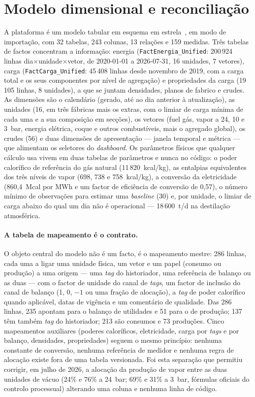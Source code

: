 \section{Modelo dimensional e reconciliação}
\label{sec:modelo-dimensional}

A plataforma é um modelo tabular em esquema em estrela~\cite{KimballRoss2013}, em modo de
importação, com 32 tabelas, 243 colunas, 13 relações e 159 medidas.
Três tabelas de factos concentram a informação: energia
(\texttt{FactEnergia\_Unified}: 200\,924 linhas dia$\times$unidade$\times$vetor,
de 2020-01-01 a 2026-07-31, 16 unidades, 7 vetores), carga
(\texttt{FactCarga\_Unified}: 45\,408 linhas desde novembro de 2019, com a
carga total e os seus componentes por nível de agregação) e propriedades
da carga (19\,105 linhas, 8 unidades), a que se juntam densidades, planos
de fabrico e crudes. As dimensões são o calendário (gerado, até ao dia
anterior à atualização), as unidades (16, em três fábricas mais os
extras, com o limiar de carga mínima de cada uma e a sua composição em
secções), os vetores (fuel gás, vapor a 24, 10 e 3~bar, energia
elétrica, coque e outros combustíveis, mais o agregado global), os crudes
(56) e duas dimensões de apresentação --- janela temporal e métrica ---
que alimentam os seletores do \emph{dashboard}. Os parâmetros físicos que
qualquer cálculo usa vivem em duas tabelas de parâmetros e nunca no
código: o poder calorífico de referência do gás natural
(11\,820~kcal/kg), as entalpias equivalentes dos três níveis de vapor
(698, 738 e 758~kcal/kg), a conversão da eletricidade (860,4~Mcal por MWh e um
factor de eficiência de conversão de 0,57), o número mínimo de
observações para estimar uma \emph{baseline} (30) e, por unidade, o limiar
de carga abaixo do qual um dia não é operacional --- 18\,600~t/d na
destilação atmosférica.

\paragraph{A tabela de mapeamento é o contrato.} O objeto central do
modelo não é um facto, é o mapeamento mestre: 286 linhas, cada uma a
ligar uma unidade física, um vetor e um papel (consumo ou produção) a
uma origem --- uma \emph{tag} do historiador, uma referência de balanço
ou as duas --- com o factor de unidade do canal de \emph{tags}, um factor
de inclusão do canal de balanço (1, 0, $-1$ ou uma fração de alocação),
a \emph{tag} de poder calorífico quando aplicável, datas de vigência e um
comentário de qualidade. Das 286 linhas, 235 apontam para o balanço de
utilidades e 51 para o de produção; 137 têm também \emph{tag} do
historiador; 213 são consumos e 73 produções. Cinco mapeamentos auxiliares
(poderes caloríficos, eletricidade, carga por \emph{tags} e por balanço,
densidades, propriedades) seguem o mesmo princípio: nenhuma constante de
conversão, nenhuma referência de medidor e nenhuma regra de alocação
existe fora de uma tabela versionada. Foi esta separação que permitiu
corrigir, em julho de 2026, a alocação da produção de vapor entre as duas
unidades de vácuo (24\% e 76\% a 24~bar; 69\% e 31\% a 3~bar, fórmulas
oficiais do controlo processual) alterando uma coluna e nenhuma linha de
código.

